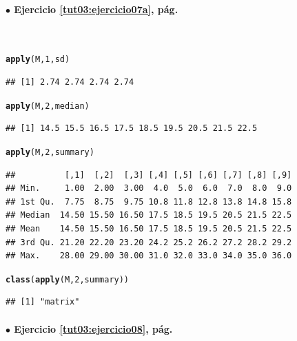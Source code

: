 \documentclass[10pt,a4paper]{article}\usepackage[]{graphicx}\usepackage[]{color}
\makeatletter
\newcommand{\hlnum}[1]{\textcolor[rgb]{0.686,0.059,0.569}{#1}}%
\newcommand{\hlstd}[1]{\textcolor[rgb]{0.345,0.345,0.345}{#1}}%
\newcommand{\hlkwd}[1]{\textcolor[rgb]{0.737,0.353,0.396}{\textbf{#1}}}%
\newenvironment{kframe}{%
 \def\at@end@of@kframe{}%
 \ifinner\ifhmode%
  \def\at@end@of@kframe{\end{minipage}}%
  \begin{minipage}{\columnwidth}%
 \fi\fi%
 \def\FrameCommand##1{\hskip\@totalleftmargin \hskip-\fboxsep
 \colorbox{shadecolor}{##1}\hskip-\fboxsep
     \hskip-\linewidth \hskip-\@totalleftmargin \hskip\columnwidth}%
 \MakeFramed {\advance\hsize-\width
   \@totalleftmargin\z@ \linewidth\hsize
   \@setminipage}}%
 {\par\unskip\endMakeFramed%
 \at@end@of@kframe}
\newenvironment{knitrout}{}{} %
\makeatother
\begin{document}
\paragraph{\bf $\bullet$ Ejercicio \ref{tut03:ejercicio07a}, pág. \pageref{tut03:ejercicio07a}}
\label{tut03:ejercicio07a:sol}\quad\\


\begin{knitrout}
\color{fgcolor}\begin{kframe}
\begin{alltt}
    \hlkwd{apply}\hlstd{(M,} \hlnum{1}\hlstd{, sd)}
\end{alltt}
\begin{verbatim}
## [1] 2.74 2.74 2.74 2.74
\end{verbatim}
\begin{alltt}
    \hlkwd{apply}\hlstd{(M,} \hlnum{2}\hlstd{, median)}
\end{alltt}
\begin{verbatim}
## [1] 14.5 15.5 16.5 17.5 18.5 19.5 20.5 21.5 22.5
\end{verbatim}
\begin{alltt}
    \hlkwd{apply}\hlstd{(M,} \hlnum{2}\hlstd{, summary)}
\end{alltt}
\begin{verbatim}
##          [,1]  [,2]  [,3] [,4] [,5] [,6] [,7] [,8] [,9]
## Min.     1.00  2.00  3.00  4.0  5.0  6.0  7.0  8.0  9.0
## 1st Qu.  7.75  8.75  9.75 10.8 11.8 12.8 13.8 14.8 15.8
## Median  14.50 15.50 16.50 17.5 18.5 19.5 20.5 21.5 22.5
## Mean    14.50 15.50 16.50 17.5 18.5 19.5 20.5 21.5 22.5
## 3rd Qu. 21.20 22.20 23.20 24.2 25.2 26.2 27.2 28.2 29.2
## Max.    28.00 29.00 30.00 31.0 32.0 33.0 34.0 35.0 36.0
\end{verbatim}
\begin{alltt}
    \hlkwd{class}\hlstd{(}\hlkwd{apply}\hlstd{(M,} \hlnum{2}\hlstd{, summary))}
\end{alltt}
\begin{verbatim}
## [1] "matrix"
\end{verbatim}
\end{kframe}
\end{knitrout}


\paragraph{\bf $\bullet$ Ejercicio \ref{tut03:ejercicio08}, pág. \pageref{tut03:ejercicio08}}
\label{tut03:ejercicio08:sol}\quad\\
\end{document}
